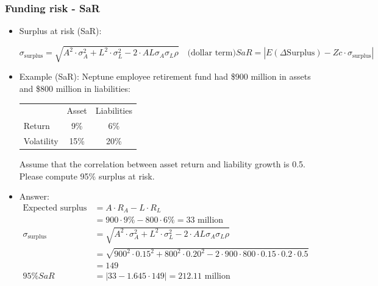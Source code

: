 \subsubsection{Funding risk - SaR}
\begin{itemize}
\item Surplus at risk (SaR):
    
\[\sigma_{\text{surplus}} = \sqrt{A^2 \cdot \sigma_A^2 + L^2 \cdot \sigma_L^2 - 2 \cdot A L \sigma_A \sigma_L \rho} \quad \text{(dollar term)} 
SaR = \left| E(\Delta \text{Surplus}) - Zc \cdot \sigma_{\text{surplus}} \right|\]


\item Example (SaR): Neptune employee retirement fund had \$900 million in assets and \$800 million in liabilities:

    \begin{tabular}{lcc}
    & Asset & Liabilities \\
    Return & 9\% & 6\% \\
    Volatility & 15\% & 20\% \\
    \end{tabular}

Assume that the correlation between asset return and liability growth is 0.5. Please compute 95\% surplus at risk.
\item Answer:
    \begin{align*}
    \text{Expected surplus growth} &= A \cdot R_A - L \cdot R_L \\
    &= 900 \cdot 9\% - 800 \cdot 6\% = 33 \text{ million} \\
    \sigma_{\text{surplus}} &= \sqrt{A^2 \cdot \sigma_A^2 + L^2 \cdot \sigma_L^2 - 2 \cdot A L \sigma_A \sigma_L \rho} \\
    &= \sqrt{900^2 \cdot 0.15^2 + 800^2 \cdot 0.20^2 - 2 \cdot 900 \cdot 800 \cdot 0.15 \cdot 0.2 \cdot 0.5} \\
    &= 149 \\
    95\% SaR &= \left| 33 - 1.645 \cdot 149 \right| = 212.11 \text{ million}
    \end{align*}
\end{itemize}












